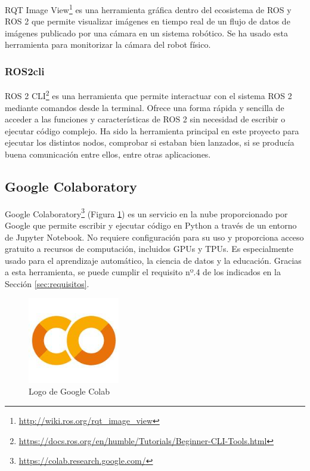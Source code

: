 RQT Image View\footnote{\url{http://wiki.ros.org/rqt_image_view}} es una herramienta gráfica dentro del ecosistema de ROS y ROS 2 que permite visualizar imágenes en tiempo real de un flujo de datos de imágenes publicado por una cámara en un sistema robótico. Se ha usado esta herramienta para monitorizar la cámara del robot físico.

\subsubsection{ROS2cli}
\label{subsubsec:ros2cli}

ROS 2 \ac{CLI}\footnote{\url{https://docs.ros.org/en/humble/Tutorials/Beginner-CLI-Tools.html}} es una herramienta que permite interactuar con el sistema ROS 2 mediante comandos desde la terminal. Ofrece una forma rápida y sencilla de acceder a las funciones y características de ROS 2 sin necesidad de escribir o ejecutar código complejo. Ha sido la herramienta principal en este proyecto para ejecutar los distintos nodos, comprobar si estaban bien lanzados, si se producía buena comunicación entre ellos, entre otras aplicaciones.


\subsection{Google Colaboratory}
\label{subsec:googlecolab}

Google Colaboratory\footnote{\url{https://colab.research.google.com/}} (Figura \ref{fig:googlecolab}) es un servicio en la nube proporcionado por Google que permite escribir y ejecutar código en Python a través de un entorno de Jupyter Notebook. No requiere configuración para su uso y proporciona acceso gratuito a recursos de computación, incluidos GPUs y TPUs. Es especialmente usado para el aprendizaje automático, la ciencia de datos y la educación. Gracias a esta herramienta, se puede cumplir el requisito nº.4 de los indicados en la Sección \ref{sec:requisitos}.

\begin{figure} [h!]
	\begin{center}
		\includegraphics[width=4cm]{figs/googlecolab.png}
	\end{center}
	\caption{Logo de Google Colab} %
	\label{fig:googlecolab}
\end{figure}

